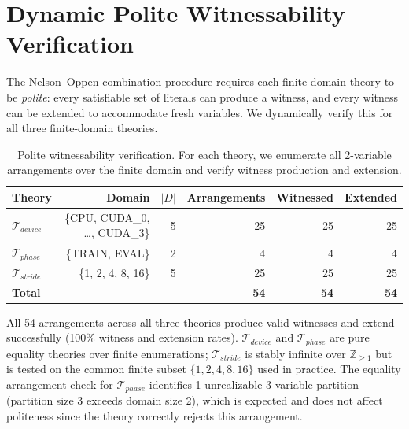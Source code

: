 \documentclass[11pt]{article}
\begin{document}
\section{Dynamic Polite Witnessability Verification}\label{app:polite-witness}

The Nelson--Oppen combination procedure requires each finite-domain
theory to be \emph{polite}: every satisfiable set of literals can
produce a witness, and every witness can be extended to accommodate
fresh variables.  We dynamically verify this for all three finite-domain
theories.

\begin{table}[h]
\centering
\caption{Polite witnessability verification.  For each theory, we
  enumerate all 2-variable arrangements over the finite domain and
  verify witness production and extension.}
\label{tab:polite-witness}
\small
\begin{tabular}{@{}lrrrrr@{}}
\toprule
\textbf{Theory} & \textbf{Domain} & \textbf{$|D|$} &
\textbf{Arrangements} & \textbf{Witnessed} & \textbf{Extended} \\
\midrule
$\mathcal{T}_{\mathit{device}}$ &
  \{CPU, CUDA\_0, \ldots, CUDA\_3\} & 5 & 25 & 25 & 25 \\
$\mathcal{T}_{\mathit{phase}}$ &
  \{TRAIN, EVAL\} & 2 & 4 & 4 & 4 \\
$\mathcal{T}_{\mathit{stride}}$ &
  \{1, 2, 4, 8, 16\} & 5 & 25 & 25 & 25 \\
\midrule
\textbf{Total} & & & \textbf{54} & \textbf{54} & \textbf{54} \\
\bottomrule
\end{tabular}
\end{table}

All 54 arrangements across all three theories produce valid witnesses
and extend successfully (100\% witness and extension rates).
$\mathcal{T}_{\mathit{device}}$ and $\mathcal{T}_{\mathit{phase}}$
are pure equality theories over finite enumerations;
$\mathcal{T}_{\mathit{stride}}$ is stably infinite over
$\mathbb{Z}_{\geq 1}$ but is tested on the common finite subset
$\{1, 2, 4, 8, 16\}$ used in practice.
The equality arrangement check for $\mathcal{T}_{\mathit{phase}}$
identifies 1 unrealizable 3-variable partition (partition size 3
exceeds domain size 2), which is expected and does not affect
politeness since the theory correctly rejects this arrangement.


\end{document}
